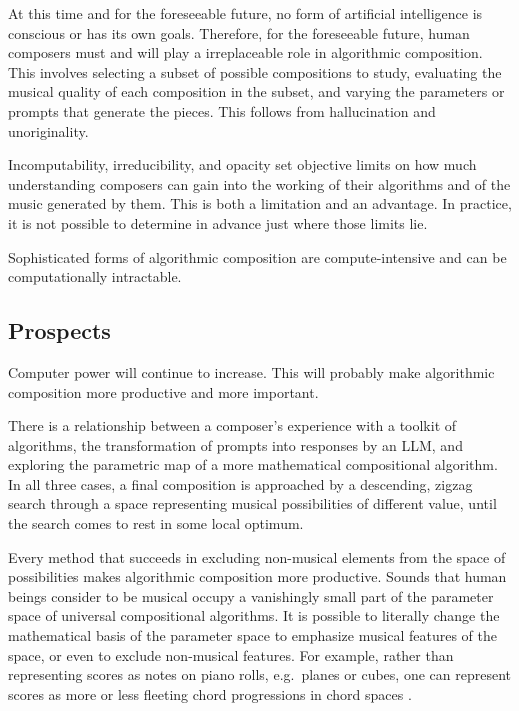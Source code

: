 \documentclass[11pt]{scrartcl}
\begin{document}
At this time and for the foreseeable future, no form of artificial intelligence is conscious or has its own goals. Therefore, for the foreseeable future, human composers must and will play a irreplaceable role in algorithmic composition. This involves selecting a subset of possible compositions to study, evaluating the musical quality of each composition in the subset, and varying the parameters or prompts that generate the pieces. This follows from hallucination and unoriginality.

Incomputability, irreducibility, and opacity set objective limits on how much understanding composers can gain into the working of their algorithms and of the music generated by them. This is both a limitation and an advantage. In practice, it is not possible to determine in advance just where those limits lie.

Sophisticated forms of algorithmic composition are compute-intensive and can be computationally intractable.

\subsection*{Prospects}

Computer power will continue to increase. This will probably make algorithmic composition more productive and more important.

There is a relationship between a composer's experience with a toolkit of algorithms, the transformation of prompts into responses by an LLM, and exploring the parametric map of a more mathematical compositional algorithm. In all three cases, a final composition is approached by a descending, zigzag search through a space representing musical possibilities of different value, until the search comes to rest in some local optimum.

Every method that succeeds in excluding non-musical elements from the space of possibilities makes algorithmic composition more productive. Sounds that human beings consider to be musical occupy a vanishingly small part of the parameter space of universal compositional algorithms. It is possible to literally change the mathematical basis of the parameter space to emphasize musical features of the space, or even to exclude non-musical features. For example, rather than representing scores as notes on piano rolls, e.g.\ planes or cubes, one can represent scores as more or less fleeting chord progressions in chord spaces \parencite{gogins2006score, gogins2023scoregraphs}.
\end{document}
